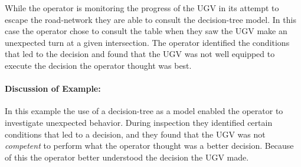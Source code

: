While the operator is monitoring the progress of the UGV in its attempt to escape the road-network they are able to consult the decision-tree model. In this case the operator chose to consult the table when they saw the UGV make an unexpected turn at a given intersection. The operator identified the conditions that led to the decision and found that the UGV was not well equipped to execute the decision the operator thought was best.
\paragraph{\textbf{Discussion of Example:}} In this example the use of a decision-tree as a model enabled the operator to investigate unexpected behavior. During inspection they identified certain conditions that led to a decision, and they found that the UGV was not \emph{competent} to perform what the operator thought was a better decision. Because of this the operator better understood the decision the UGV made.
